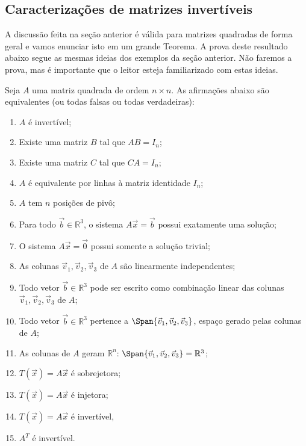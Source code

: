\subsection{Caracterizações de matrizes invertíveis}


A discussão feita na seção anterior é válida para matrizes quadradas de forma geral e vamos enunciar isto em um grande Teorema. A prova deste resultado abaixo segue as mesmas ideias dos exemplos da seção anterior. Não faremos a prova, mas é importante que o leitor esteja familiarizado com estas ideias.


\begin{teo}
	Seja $A$ uma matriz quadrada de ordem $n\times n$. As afirmações abaixo são equivalentes (ou todas falsas ou todas verdadeiras):
	\begin{enumerate}
		\item $A$ é invertível;
		\item Existe uma matriz $B$ tal que $AB = I_n$;
		\item Existe uma matriz $C$ tal que $CA = I_n$;
		\item $A$ é equivalente por linhas à matriz identidade $I_n$;
		\item $A$ tem $n$ posições de pivô;
		\item Para todo $\vec{b} \in \mathbb{R}^3$, o sistema $A \vec{x} = \vec{b}$ possui exatamente uma solução;
		\item O sistema $A \vec{x} = \vec{0}$ possui somente a solução trivial;
		\item As colunas $\vec{v}_1, \vec{v}_2, \vec{v}_3$ de $A$ são linearmente independentes;
		\item Todo vetor $\vec{b} \in \mathbb{R}^3$ pode ser escrito como combinação linear das colunas $\vec{v}_1, \vec{v}_2, \vec{v}_3$ de $A$;
		\item Todo vetor $\vec{b} \in \mathbb{R}^3$ pertence a $\Span\{\vec{v}_1, \vec{v}_2, \vec{v}_3\}$, espaço gerado pelas colunas de $A$;
		\item As colunas de $A$ geram $\mathbb{R}^n$: $\Span\{\vec{v}_1, \vec{v}_2, \vec{v}_3\} = \mathbb{R}^3$;
		\item $T(\vec{x}) = A \vec{x}$ é sobrejetora;
		\item $T(\vec{x}) = A \vec{x}$ é injetora;
		\item $T(\vec{x}) = A \vec{x}$ é invertível,
		\item $A^T$ é invertível.
	\end{enumerate}
\end{teo}

